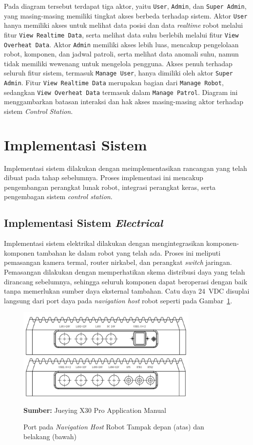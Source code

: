 Pada diagram tersebut terdapat tiga aktor, yaitu \texttt{User}, \texttt{Admin}, dan \texttt{Super Admin}, yang masing-masing memiliki tingkat akses berbeda terhadap sistem. Aktor \texttt{User} hanya memiliki akses untuk melihat data posisi dan data \emph{realtime} robot melalui fitur \texttt{View Realtime Data}, serta melihat data suhu berlebih melalui fitur \texttt{View Overheat Data}. Aktor \texttt{Admin} memiliki akses lebih luas, mencakup pengelolaan robot, komponen, dan jadwal patroli, serta melihat data anomali suhu, namun tidak memiliki wewenang untuk mengelola pengguna. Akses penuh terhadap seluruh fitur sistem, termasuk \texttt{Manage User}, hanya dimiliki oleh aktor \texttt{Super Admin}. Fitur \texttt{View Realtime Data} merupakan bagian dari \texttt{Manage Robot}, sedangkan \texttt{View Overheat Data} termasuk dalam \texttt{Manage Patrol}. Diagram ini menggambarkan batasan interaksi dan hak akses masing-masing aktor terhadap sistem \emph{Control Station}.


\section{Implementasi Sistem}
\sloppy
Implementasi sistem dilakukan dengan meimplementasikan rancangan yang telah dibuat pada tahap sebelumnya. Proses implementasi ini mencakup pengembangan perangkat lunak robot, integrasi perangkat keras, serta pengembagan sistem \emph{control station}.

\subsection{Implementasi Sistem \emph{Electrical}}
Implementasi sistem elektrikal dilakukan dengan mengintegrasikan komponen-komponen tambahan ke dalam robot yang telah ada. Proses ini meliputi pemasangan kamera termal, router nirkabel, dan perangkat \emph{switch} jaringan. Pemasangan dilakukan dengan memperhatikan skema distribusi daya yang telah dirancang sebelumnya, sehingga seluruh komponen dapat beroperasi dengan baik tanpa memerlukan sumber daya eksternal tambahan. Catu daya 24~VDC disuplai langsung dari port daya pada \emph{navigation host} robot seperti pada Gambar~\ref{fig:int-control-port}. 

\begin{figure}[H]
  \centering
  \includegraphics[width=0.8\textwidth]{gambar/bab3/int-control-port.png}
  \caption{Port pada \emph{Navigation Host} Robot  Tampak depan (atas) dan belakang (bawah)}
  \label{fig:int-control-port}
  \footnotesize{\textbf{Sumber:} Jueying X30 Pro Application Manual}
\end{figure}

